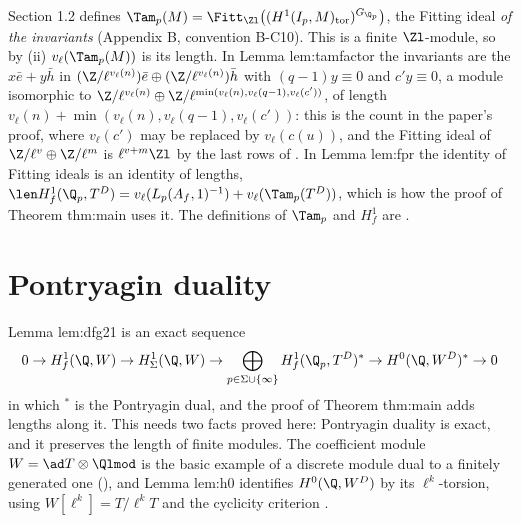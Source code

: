 \begin{paperlink}\label{pl:modules:tamagawa}
Section 1.2 defines $\Tam_p(M)=\Fitt_{\Zl}\bigl((H^1(I_p,M)_{\mathrm{tor}})^{G_{\Q_p}}\bigr)$, the Fitting ideal \emph{of the invariants} (Appendix B, convention
B-C10). This is a finite $\Zl$-module, so by
(ii) $v_\ell(\Tam_p(M))$ is its length. In Lemma lem:tamfactor the invariants are the $x\bar e+y\bar h$ in
$(\Z/\ell^{v_\ell(n)})\bar e\oplus(\Z/\ell^{v_\ell(n)})\bar h$ with $(q-1)y\equiv0$ and $c'y\equiv0$, a module isomorphic to $\Z/\ell^{v_\ell(n)}\oplus\Z/\ell^{\min(v_\ell(n),v_\ell(q-1),v_\ell(c'))}$, of
length $v_\ell(n)+\min(v_\ell(n),v_\ell(q-1),v_\ell(c'))$: this is the count in the paper's proof, where $v_\ell(c')$ may be replaced by $v_\ell(c(u))$, and the Fitting ideal of $\Z/\ell^v\oplus\Z/\ell^m$ is
$\ell^{v+m}\Zl$ by the last rows of . In Lemma lem:fpr the identity of Fitting ideals is an identity of
lengths, $\len H^1_f(\Q_p,T^D)=v_\ell(L_p(A_f,1)^{-1})+v_\ell(\Tam_p(T^D))$, which is how the proof of Theorem thm:main uses it. The definitions of
$\Tam_p$ and $H^1_f$ are .
\end{paperlink}

\section{Pontryagin duality}\label{sec:modules:pontryagin}

Lemma lem:dfg21 is an exact sequence
\[
0\to H^1_f(\Q,W)\to H^1_\Sigma(\Q,W)\to\bigoplus_{p\in\Sigma\cup\{\infty\}}H^1_f(\Q_p,T^D)^*\to H^0(\Q,W^D)^*\to0
\]
in which ${}^*$ is the Pontryagin dual, and the proof of Theorem thm:main adds lengths along it. This needs two facts proved here: Pontryagin
duality is exact, and it preserves the length of finite modules. The coefficient module $W=\ad T\otimes\Qlmod$ is the basic example of a
discrete module dual to a finitely generated one (), and Lemma lem:h0 identifies $H^0(\Q,W^D)$ by its
$\ell^k$-torsion, using $W[\ell^k]=T/\ell^kT$ and the cyclicity criterion .

